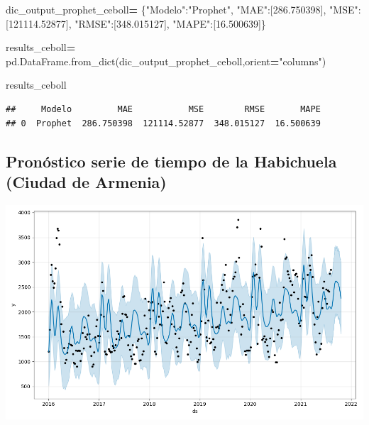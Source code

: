 \documentclass[
]{book}
\newenvironment{Shaded}{\begin{snugshade}}{\end{snugshade}}
\newcommand{\FloatTok}[1]{\textcolor[rgb]{0.00,0.00,0.81}{#1}}
\newcommand{\NormalTok}[1]{#1}
\newcommand{\OperatorTok}[1]{\textcolor[rgb]{0.81,0.36,0.00}{\textbf{#1}}}
\newcommand{\StringTok}[1]{\textcolor[rgb]{0.31,0.60,0.02}{#1}}
\begin{document}
\begin{Shaded}
\begin{Highlighting}[]

\NormalTok{dic\_output\_prophet\_ceboll}\OperatorTok{=}\NormalTok{ \{}\StringTok{"Modelo"}\NormalTok{:}\StringTok{"Prophet"}\NormalTok{,}
                 \StringTok{"MAE"}\NormalTok{:[}\FloatTok{286.750398}\NormalTok{],}
                 \StringTok{"MSE"}\NormalTok{:[}\FloatTok{121114.52877}\NormalTok{],}
                 \StringTok{"RMSE"}\NormalTok{:[}\FloatTok{348.015127}\NormalTok{],}
                 \StringTok{"MAPE"}\NormalTok{:[}\FloatTok{16.500639}\NormalTok{]\}}

\NormalTok{results\_ceboll}\OperatorTok{=}\NormalTok{ pd.DataFrame.from\_dict(dic\_output\_prophet\_ceboll,orient}\OperatorTok{=}\StringTok{"columns"}\NormalTok{)}

\NormalTok{results\_ceboll}
\end{Highlighting}
\end{Shaded}

\begin{verbatim}
##     Modelo         MAE           MSE        RMSE       MAPE
## 0  Prophet  286.750398  121114.52877  348.015127  16.500639
\end{verbatim}

\hypertarget{pronuxf3stico-serie-de-tiempo-de-la-habichuela-ciudad-de-armenia-2}{%
\subsection{Pronóstico serie de tiempo de la Habichuela (Ciudad de Armenia)}\label{pronuxf3stico-serie-de-tiempo-de-la-habichuela-ciudad-de-armenia-2}}

\includegraphics{Prophet_Habichuela_AXM.png}
\end{document}
